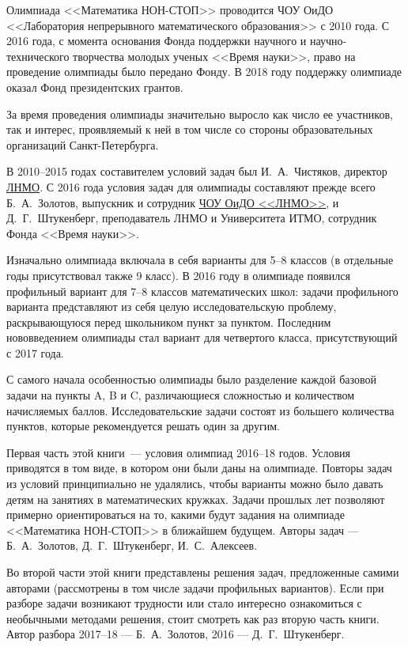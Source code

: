 \noindent\abz Олимпиада <<Математика НОН-СТОП>> проводится \hypertarget{lcme}{ЧОУ ОиДО <<Лаборатория непрерывного математического образования>>} с 2010 года. С 2016 года, с момента основания Фонда поддержки научного и научно-технического творчества молодых ученых <<Время науки>>, право на проведение олимпиады было передано Фонду. В 2018 году поддержку олимпиаде оказал Фонд президентских грантов. 

\aabz За время проведения олимпиады значительно выросло как число ее участников, так и интерес, проявляемый к ней в том числе со стороны образовательных организаций Санкт-Петербурга.

\aabz В 2010--2015 годах составителем условий задач был И.~А.~Чистяков, директор \hyperlink{lcme}{ЛНМО}. С 2016 года условия задач для олимпиады составляют прежде всего Б.~А.~Золотов, выпускник и сотрудник \hyperlink{lcme}{ЧОУ ОиДО <<ЛНМО>>}, и Д.~Г.~Штукенберг, преподаватель ЛНМО и Университета ИТМО, сотрудник Фонда <<Время науки>>.

\aabz Изначально олимпиада включала в себя варианты для 5--8 классов (в отдельные годы присутствовал также 9 класс). В 2016 году в олимпиаде появился профильный вариант для 7--8 классов математических школ: задачи профильного варианта представляют из себя целую исследовательскую проблему, раскрывающуюся перед школьником пункт за пунктом.  Последним нововведением олимпиады стал вариант для четвертого класса, присутствующий с 2017 года.

\aabz С самого начала особенностью олимпиады было разделение каждой базовой задачи на пункты A, B и C, различающиеся сложностью и количеством начисляемых баллов. Исследовательские задачи состоят из большего количества пунктов, которые рекомендуется решать один за другим.

\aabz Первая часть этой книги~--- условия олимпиад 2016--18 годов. Условия приводятся в том виде, в котором они были даны на олимпиаде. 
Повторы задач из условий принципиально не удалялись, чтобы варианты можно было давать детям на занятиях в математических кружках. Задачи прошлых лет позволяют примерно ориентироваться на то, какими будут задания на олимпиаде <<Математика НОН-СТОП>> в ближайшем будущем. Авторы задач — Б.~А.~Золотов, Д.~Г.~Штукенберг, И.~С.~Алексеев.

\aabz Во второй части этой книги представлены решения задач, предложенные самими авторами (рассмотрены в том числе задачи профильных вариантов). Если при разборе задачи возникают трудности или стало интересно ознакомиться с необычными методами решения, стоит смотреть как раз вторую часть книги. Автор разбора 2017–18 — Б.~А.~Золотов, 2016 — Д.~Г.~Штукенберг.

